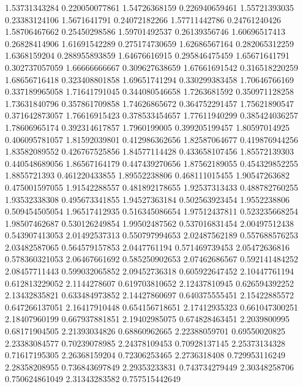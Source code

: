   1.53731343284   0.220050077861
  1.54726368159   0.226940659461
  1.55721393035    0.23383124106
   1.5671641791    0.24072182266
  1.57711442786    0.24761240426
  1.58706467662    0.25450298586
  1.59701492537    0.26139356746
  1.60696517413    0.26828414906
  1.61691542289   0.275174730659
  1.62686567164   0.282065312259
   1.6368159204   0.288955893859
  1.64676616915   0.295846475459
  1.65671641791   0.302737057059
  1.66666666667   0.309627638659
  1.67661691542   0.316518220259
  1.68656716418   0.323408801858
  1.69651741294   0.330299383458
  1.70646766169   0.337189965058
  1.71641791045   0.344080546658
   1.7263681592   0.350971128258
  1.73631840796   0.357861709858
  1.74626865672   0.364752291457
  1.75621890547   0.371642873057
  1.76616915423   0.378533454657
  1.77611940299   0.385424036257
  1.78606965174   0.392314617857
   1.7960199005   0.399205199457
  1.80597014925   0.406095781057
  1.81592039801   0.412986362656
  1.82587064677   0.419876944256
  1.83582089552   0.426767525856
  1.84577114428   0.433658107456
  1.85572139303   0.440548689056
  1.86567164179   0.447439270656
  1.87562189055   0.454329852255
   1.8855721393   0.461220433855
  1.89552238806   0.468111015455
  1.90547263682   0.475001597055
  1.91542288557   0.481892178655
  1.92537313433   0.488782760255
  1.93532338308   0.495673341855
  1.94527363184   0.502563923454
   1.9552238806   0.509454505054
  1.96517412935   0.516345086654
  1.97512437811   0.523235668254
  1.98507462687   0.530126249854
  1.99502487562   0.537016831454
  2.00497512438   0.543907413053
  2.01492537313   0.550797994653
  2.02487562189   0.557688576253
  2.03482587065   0.564579157853
   2.0447761194   0.571469739453
  2.05472636816   0.578360321053
  2.06467661692   0.585250902653
  2.07462686567   0.592141484252
  2.08457711443   0.599032065852
  2.09452736318   0.605922647452
  2.10447761194   0.612813229052
   2.1144278607   0.619703810652
  2.12437810945   0.626594392252
  2.13432835821   0.633484973852
  2.14427860697   0.640375555451
  2.15422885572   0.647266137051
  2.16417910448   0.654156718651
  2.17412935323   0.661047300251
  2.18407960199   0.667937881851
  2.19402985075   0.674828463451
   2.2039800995    0.68171904505
  2.21393034826    0.68860962665
  2.22388059701    0.69550020825
  2.23383084577    0.70239078985
  2.24378109453    0.70928137145
  2.25373134328    0.71617195305
  2.26368159204    0.72306253465
   2.2736318408   0.729953116249
  2.28358208955   0.736843697849
  2.29353233831   0.743734279449
  2.30348258706   0.750624861049
  2.31343283582   0.757515442649
